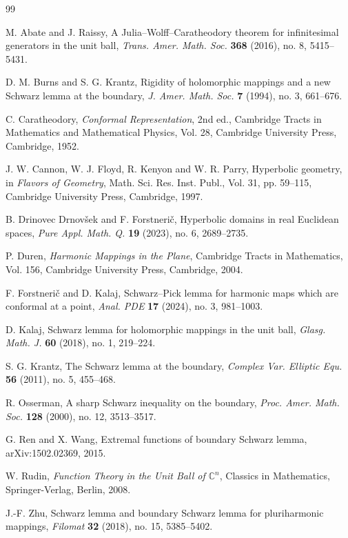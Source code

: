 \documentclass[11pt]{amsart}
\theoremstyle{definition}
\theoremstyle{remark}
\newcommand{\C}{\mathbb C}
\begin{document}
\begin{thebibliography}{99}

M. Abate and J. Raissy,
\newblock A Julia--Wolff--Caratheodory theorem for infinitesimal generators in the unit ball,
\newblock \emph{Trans. Amer. Math. Soc.} \textbf{368} (2016), no. 8, 5415--5431.

D. M. Burns and S. G. Krantz,
\newblock Rigidity of holomorphic mappings and a new Schwarz lemma at the boundary,
\newblock \emph{J. Amer. Math. Soc.} \textbf{7} (1994), no. 3, 661--676.

C. Caratheodory,
\newblock \emph{Conformal Representation}, 2nd ed.,
\newblock Cambridge Tracts in Mathematics and Mathematical Physics, Vol. 28,
\newblock Cambridge University Press, Cambridge, 1952.

J. W. Cannon, W. J. Floyd, R. Kenyon and W. R. Parry,
\newblock Hyperbolic geometry,
\newblock in \emph{Flavors of Geometry}, Math. Sci. Res. Inst. Publ., Vol. 31, pp. 59--115,
\newblock Cambridge University Press, Cambridge, 1997.

B. Drinovec Drnov\v sek and F. Forstneri\v c,
\newblock Hyperbolic domains in real Euclidean spaces,
\newblock \emph{Pure Appl. Math. Q.} \textbf{19} (2023), no. 6, 2689--2735.

P. Duren,
\newblock \emph{Harmonic Mappings in the Plane},
\newblock Cambridge Tracts in Mathematics, Vol. 156,
\newblock Cambridge University Press, Cambridge, 2004.

F. Forstneri\v c and D. Kalaj,
\newblock Schwarz--Pick lemma for harmonic maps which are conformal at a point,
\newblock \emph{Anal. PDE} \textbf{17} (2024), no. 3, 981--1003.

D. Kalaj,
\newblock Schwarz lemma for holomorphic mappings in the unit ball,
\newblock \emph{Glasg. Math. J.} \textbf{60} (2018), no. 1, 219--224.

S. G. Krantz,
\newblock The Schwarz lemma at the boundary,
\newblock \emph{Complex Var. Elliptic Equ.} \textbf{56} (2011), no. 5, 455--468.

R. Osserman,
\newblock A sharp Schwarz inequality on the boundary,
\newblock \emph{Proc. Amer. Math. Soc.} \textbf{128} (2000), no. 12, 3513--3517.

G. Ren and X. Wang,
\newblock Extremal functions of boundary Schwarz lemma,
\newblock arXiv:1502.02369, 2015.

W. Rudin,
\newblock \emph{Function Theory in the Unit Ball of \(\C^n\)},
\newblock Classics in Mathematics,
\newblock Springer-Verlag, Berlin, 2008.

J.-F. Zhu,
\newblock Schwarz lemma and boundary Schwarz lemma for pluriharmonic mappings,
\newblock \emph{Filomat} \textbf{32} (2018), no. 15, 5385--5402.

\end{thebibliography}
\end{document}
